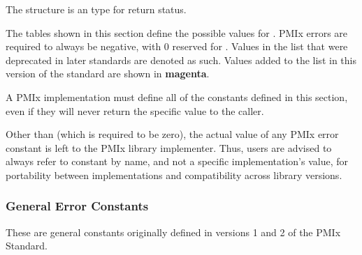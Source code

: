 The  structure is an  type for return status.

The tables shown in this section define the possible values for .
PMIx errors are required to always be negative, with 0 reserved for . Values in the list that were deprecated in later standards are denoted as such. Values added to the list in this version of the standard are shown in \textbf{\color{magenta}magenta}.

\adviceimplstart
A PMIx implementation must define all of the constants defined in this section, even if they will never return the specific value to the caller.
\adviceimplend

\adviceuserstart
Other than  (which is required to be zero), the actual value of any \ac{PMIx} error constant is left to the \ac{PMIx} library implementer. Thus, users are advised to always refer to constant by name, and not a specific implementation's value, for portability between implementations and compatibility across library versions.
\adviceuserend

\subsubsection{General Error Constants}

These are general constants originally defined in versions 1 and 2 of the PMIx Standard.

